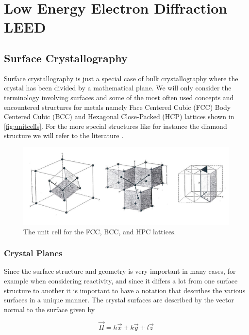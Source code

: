 \chapter{Low Energy Electron Diffraction LEED}
\section{Surface Crystallography}
Surface crystallography is just a special case of bulk crystallography where the crystal has been divided by a mathematical plane. We will only consider the terminology involving surfaces and some of the most often used concepts and encountered structures for metals namely Face Centered Cubic (FCC) Body Centered Cubic (BCC) and Hexagonal Close-Packed (HCP) lattices shown in \autoref{fig:unitcells}. For the more special structures like for instance the diamond structure we will refer to the literature \cite{Kittel, Ashcroft}.

\begin{figure}[h!]
	\begin{center}
	\includegraphics[scale=4]{figures/09_01.png}
	\caption{The unit cell for the FCC, BCC, and HPC lattices.}
	\label{fig:unitcells}
	\end{center}
\end{figure}

\subsection{Crystal Planes}
Since the surface structure and geometry is very important in many cases, for example when considering reactivity, and since it differs a lot from one surface structure to another it is important to have a notation that describes the various surfaces in a unique manner. The crystal surfaces are described by the vector normal to the surface given by

\begin{equation}
\vec{H}=h\vec{x}+k\vec{y}+l\vec{z}
\end{equation}

